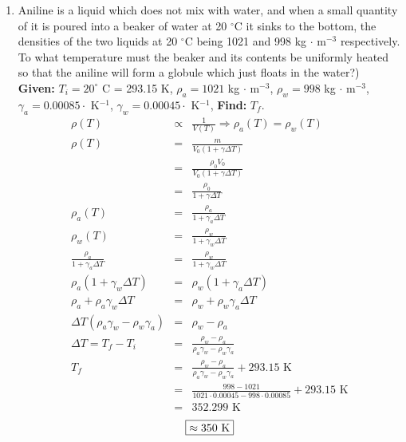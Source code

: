 \documentclass[12pt]{article}
\begin{document}
\begin{enumerate}
	\item Aniline is a liquid which does not mix with water, and when a small quantity of it is poured into a beaker of water at 20 $^\circ$C it sinks to the bottom, the densities of the two liquids at 20 $^\circ$C being 1021 and 998 kg $\cdot$ m$^{-3}$ respectively. To what temperature must the beaker and its contents be uniformly heated so that the aniline will form a globule which just floats in the water?)\\
	\textbf {Given: } $T_i = 20 ^\circ$ C = 293.15 K, $\rho_a = 1021$ kg $\cdot$ m$^{-3}$, $\rho_w = 998$ kg $\cdot$ m$^{-3}$, $\gamma_a = 0.00085 \cdot$ K$^{-1}$, $\gamma_w = 0.00045 \cdot$ K$^{-1}$, \textbf{Find: }$T_f$.
	\begin{eqnarray*}
		 \rho(T) &\propto & \frac{1}{V(T)} \Rightarrow \rho_a (T) = \rho_w (T)\\
		 \rho (T) &=& \frac{m}{V_0 (1 + \gamma\Delta T)}\\
		 &=& \frac{\rho_0 V_0}{V_0 (1 + \gamma\Delta T)}\\
		 &=& \frac{\rho_0}{1 + \gamma\Delta T}\\
		 \rho_a (T) &=& \frac{\rho_a}{1 + \gamma_a\Delta T}\\
		 \rho_w (T) &=& \frac{\rho_w}{1 + \gamma_w\Delta T}\\
		 \frac{\rho_a}{1 + \gamma_a\Delta T} &=& \frac{\rho_w}{1 + \gamma_w\Delta T}\\
		 \rho_a(1 + \gamma_w\Delta T) &=& \rho_w(1 + \gamma_a\Delta T)\\
		 \rho_a + \rho_a \gamma_w \Delta T &=& \rho_w + \rho_w \gamma_a \Delta T\\
		 \Delta T(\rho_a\gamma_w - \rho_w\gamma_a) &=& \rho_w - \rho_a\\
		 \Delta T = T_f - T_i &=& \frac{\rho_w - \rho_a}{\rho_a\gamma_w - \rho_w\gamma_a}\\
		 T_f &=& \frac{\rho_w - \rho_a}{\rho_a\gamma_w - \rho_w\gamma_a} + 293.15 \mbox{ K}\\
		 &=& \frac{998 - 1021}{1021\cdot 0.00045 - 998 \cdot 0.00085} + 293.15 \mbox{ K}\\
		 &=& 352.299 \mbox{ K}
	\end{eqnarray*}
	$$\fbox{$\approx 350$ K}$$
	

\end{enumerate}
\end{document}
